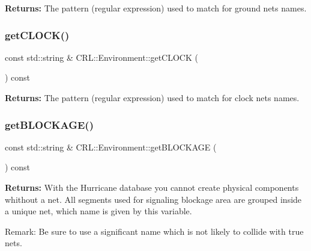 {\bfseries Returns\+:} The pattern (regular expression) used to match for ground nets names. \mbox{\label{classCRL_1_1Environment_ab19c72626a542359bbf9cb17cdee23a8}} 
\subsubsection{\texorpdfstring{get\+C\+L\+O\+C\+K()}{getCLOCK()}}
{\footnotesize\ttfamily const std\+::string \& C\+R\+L\+::\+Environment\+::get\+C\+L\+O\+CK (\begin{DoxyParamCaption}{ }\end{DoxyParamCaption}) const\hspace{0.3cm}{\ttfamily [inline]}}

{\bfseries Returns\+:} The pattern (regular expression) used to match for clock nets names. \mbox{\label{classCRL_1_1Environment_a19adcaebb99dc8a316261ddff72f9b56}} 
\subsubsection{\texorpdfstring{get\+B\+L\+O\+C\+K\+A\+G\+E()}{getBLOCKAGE()}}
{\footnotesize\ttfamily const std\+::string \& C\+R\+L\+::\+Environment\+::get\+B\+L\+O\+C\+K\+A\+GE (\begin{DoxyParamCaption}{ }\end{DoxyParamCaption}) const\hspace{0.3cm}{\ttfamily [inline]}}

{\bfseries Returns\+:} With the Hurricane database you cannot create physical components whithout a net. All segments used for signaling blockage area are grouped inside a unique net, which name is given by this variable.

\begin{DoxyParagraph}{Remark\+: Be sure to use a significant name which is not likely to collide}
with true nets. 
\end{DoxyParagraph}
\mbox{\label{classCRL_1_1Environment_a5f0df5fadd73c2246f7e6775314bb5fa}} 
